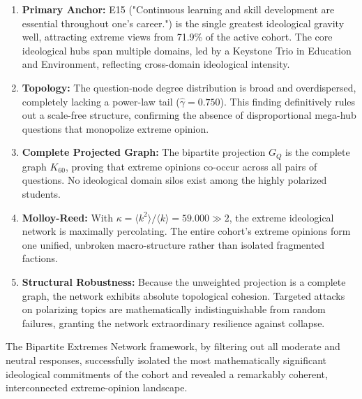 \documentclass[11pt, a4paper]{article}
\begin{document}
\begin{enumerate}
    \item \textbf{Primary Anchor:} E15 ("Continuous learning and skill development are essential throughout one's career.") is the single greatest ideological gravity well, attracting extreme views from 71.9\% of the active cohort. The core ideological hubs span multiple domains, led by a Keystone Trio in Education and Environment, reflecting cross-domain ideological intensity.

    \item \textbf{Topology:} The question-node degree distribution is broad and overdispersed, completely lacking a power-law tail ($\hat{\gamma} = 0.750$). This finding definitively rules out a scale-free structure, confirming the absence of disproportional mega-hub questions that monopolize extreme opinion.

    \item \textbf{Complete Projected Graph:} The bipartite projection $G_Q$ is the complete graph $K_{60}$, proving that extreme opinions co-occur across all pairs of questions. No ideological domain silos exist among the highly polarized students.

    \item \textbf{Molloy-Reed:} With $\kappa = \langle k^2 \rangle / \langle k \rangle = 59.000 \gg 2$, the extreme ideological network is maximally percolating. The entire cohort's extreme opinions form one unified, unbroken macro-structure rather than isolated fragmented factions.

    \item \textbf{Structural Robustness:} Because the unweighted projection is a complete graph, the network exhibits absolute topological cohesion. Targeted attacks on polarizing topics are mathematically indistinguishable from random failures, granting the network extraordinary resilience against collapse.
\end{enumerate}

The Bipartite Extremes Network framework, by filtering out all moderate and neutral responses, successfully isolated the most mathematically significant ideological commitments of the cohort and revealed a remarkably coherent, interconnected extreme-opinion landscape.
\end{document}
